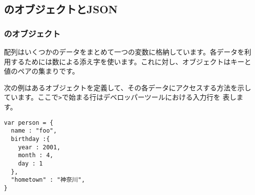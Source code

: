 \subsection{\JS のオブジェクトとJSON}
\subsubsection{\JS のオブジェクト}
配列はいくつかのデータをまとめて一つの変数に格納しています。各データを利
用するためには数による添え字を使います。これに対し、オブジェクトはキーと
値のペアの集まりです。

次の例はあるオブジェクトを定義して、その各データにアクセスする方法を示し
ています。ここで\texttt{>}で始まる行はデベロッパーツールにおける入力行を
表します。
\begin{Verbatim}
var person = {
  name : "foo",
  birthday :{
    year : 2001,
    month : 4,
    day : 1
  },
  "hometown" : "神奈川",
}
\end{Verbatim}
